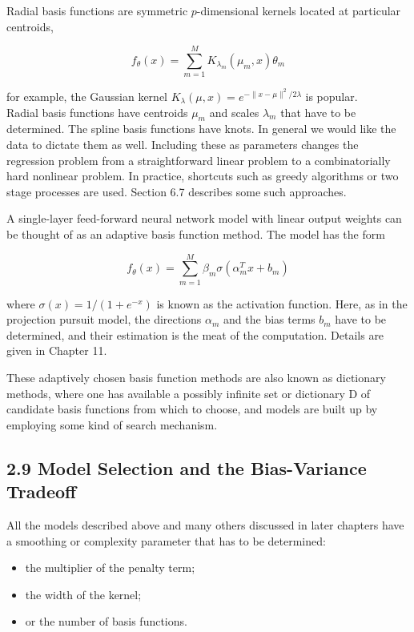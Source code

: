 \documentclass[10pt]{article}
\begin{document}
Radial basis functions are symmetric $p$-dimensional kernels located at particular centroids,


\begin{equation*}
f_{\theta}(x)=\sum_{m=1}^{M} K_{\lambda_{m}}\left(\mu_{m}, x\right) \theta_{m} \tag{2.44}
\end{equation*}


for example, the Gaussian kernel $K_{\lambda}(\mu, x)=e^{-\|x-\mu\|^{2} / 2 \lambda}$ is popular.\\
Radial basis functions have centroids $\mu_{m}$ and scales $\lambda_{m}$ that have to be determined. The spline basis functions have knots. In general we would like the data to dictate them as well. Including these as parameters changes the regression problem from a straightforward linear problem to a combinatorially hard nonlinear problem. In practice, shortcuts such as greedy algorithms or two stage processes are used. Section 6.7 describes some such approaches.

A single-layer feed-forward neural network model with linear output weights can be thought of as an adaptive basis function method. The model has the form


\begin{equation*}
f_{\theta}(x)=\sum_{m=1}^{M} \beta_{m} \sigma\left(\alpha_{m}^{T} x+b_{m}\right) \tag{2.45}
\end{equation*}


where $\sigma(x)=1 /\left(1+e^{-x}\right)$ is known as the activation function. Here, as in the projection pursuit model, the directions $\alpha_{m}$ and the bias terms $b_{m}$ have to be determined, and their estimation is the meat of the computation. Details are given in Chapter 11.

These adaptively chosen basis function methods are also known as dictionary methods, where one has available a possibly infinite set or dictionary D of candidate basis functions from which to choose, and models are built up by employing some kind of search mechanism.

\subsection*{2.9 Model Selection and the Bias-Variance Tradeoff}
All the models described above and many others discussed in later chapters have a smoothing or complexity parameter that has to be determined:

\begin{itemize}
  \item the multiplier of the penalty term;
  \item the width of the kernel;
  \item or the number of basis functions.
\end{itemize}
\end{document}
